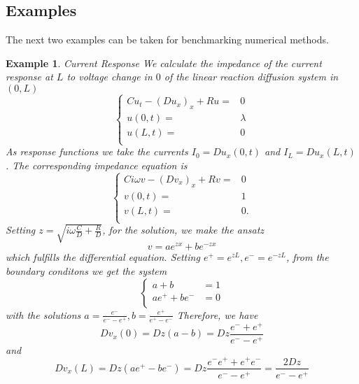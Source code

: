 \documentclass[12pt]{amsproc}
\newtheorem{example}{Example}
\begin{document}
\subsection{Examples}
The next two examples can be taken for benchmarking numerical methods.
\begin{example}{Current Response}
  We calculate the impedance of the current response at $L$ to voltage change in $0$ of the linear reaction  diffusion system in $(0,L)$  
  \begin{equation*}
    \begin{cases}
      Cu_t - (Du_x)_x + Ru=&0\\
      u(0,t)=&\lambda\\
      u(L,t)=&0\\
    \end{cases}
  \end{equation*}
    As response functions we take the currents  $I_0=Du_x(0,t)$ and $I_L=Du_x(L,t)$.
    The corresponding impedance equation is
    \begin{equation*}
      \begin{cases}
        Ci\omega v - (Dv_x)_x +Rv =&0\\
        v(0,t)=&1\\
        v(L,t)=&0.\\
      \end{cases}
    \end{equation*}
Setting $z=\sqrt{i\omega\frac{C}{D}+\frac{R}{D}}$, for the solution, we make the ansatz
\begin{equation*}
  v=ae^{zx}+be^{-zx}
\end{equation*}
which fulfills the differential equation.
Setting $e^+=e^{zL},e^-=e^{-zL}$, from the boundary 
conditons we get the system
\begin{equation*}
  \begin{cases}
    a+b&=1\\
    ae^++be^-&=0\\
  \end{cases}
\end{equation*}
with the solutions $a=\frac{e^-}{e^--e^+},b=\frac{e^+}{e^+-e^-}$
Therefore, we have
\begin{equation*}
  Dv_x(0)=Dz(a-b)=Dz\frac{e^-+e^+}{e^--e^+}
\end{equation*}
and
\begin{equation*}
  Dv_x(L)=Dz(ae^+-be^-)=Dz\frac{e^-e^++e^+e^-}{e^--e^+}=\frac{2Dz}{e^--e^+}
\end{equation*}


\end{example}
\end{document}
